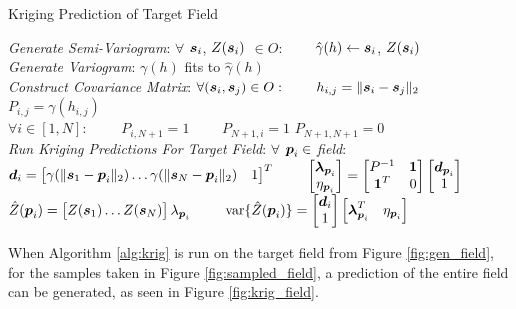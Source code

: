 \begin{algorithm}[thpb!]
\caption{Kriging Prediction of Target Field}\label{alg:krig}
\begin{algorithmic}[1]
\BState \emph{Generate Semi-Variogram}:
\State $\forall$ ${\it{\boldsymbol{s}}}_i$, $Z({\it{\boldsymbol{s}}}_i)$ $\in O$:
\State \ \ \ \ $\hat{\gamma}(h) \gets {\it{\boldsymbol{s}}}_i$, $Z({\it{\boldsymbol{s}}}_i)$\\
\BState \emph{Generate Variogram}:
\State $\gamma(h)$ fits to $\hat{\gamma}(h)$\\
\BState \emph{Construct Covariance Matrix}:
\State $\forall ({\it{\boldsymbol{s}}}_i,{\it{\boldsymbol{s}}}_j) \in O:$
\State \ \ \ \ $h_{i,j} = \|{\it{\boldsymbol{s}}}_i - {\it{\boldsymbol{s}}}_j\|_2$
\State \ \ \ \ $P_{i,j} = \gamma(h_{i,j})$\\
\State $\forall i \in [1, N]:$
\State \ \ \ \ $P_{i,N+1} = 1$
\State \ \ \ \ $P_{N+1,i} = 1$
\State $P_{N+1,N+1} = 0$\\
\BState \emph{Run Kriging Predictions For Target Field}:
\State $\forall$ ${\it{\boldsymbol{p}}}_i \in$ \textit{field}:
\State \ \ \ \ ${\it{\boldsymbol{d}}}_{i} = \begin{bmatrix} \gamma(\| {\it{\boldsymbol{s}}}_1 - {\it{\boldsymbol{p}}}_i \|_2) \dots \gamma(\| {\it{\boldsymbol{s}}}_N - {\it{\boldsymbol{p}}}_i \|_2) & 1\end{bmatrix}^T$
\State \ \ \ \ $\begin{bmatrix}
                {\it{\boldsymbol{\lambda}}}_{{\it{\boldsymbol{p}}}_i} \\
                \eta_{{\it{\boldsymbol{p}}}_i}
                \end{bmatrix} = \begin{bmatrix} P^{-1} & {\it{\boldsymbol{1}}} \\
                                    {\it{\boldsymbol{1}}}^T & 0 \end{bmatrix}
                                    \begin{bmatrix} 
                                    {\it{\boldsymbol{d}}}_{{\it{\boldsymbol{p}}}_i} \\
                                    1
                                    \end{bmatrix}$
\State \ \ \ \ $\hat{Z}({\it{\boldsymbol{p}}}_i) = \begin{bmatrix} Z({\it{\boldsymbol{s}}}_1) \dots Z({\it{\boldsymbol{s}}}_N) \end{bmatrix} \lambda_{{\it{\boldsymbol{p}}}_i}$
\State \ \ \ \ $\text{var}\{\hat{Z}({\it{\boldsymbol{p}}}_i)\} = \begin{bmatrix}{\it{\boldsymbol{d}}}_i \\ 1\end{bmatrix} \begin{bmatrix}{\it{\boldsymbol{\lambda}}}_{{\it{\boldsymbol{p}}}_i}^T & \eta_{{\it{\boldsymbol{p}}}_i} \end{bmatrix}$
\EndProcedure
\end{algorithmic}
\end{algorithm}

When Algorithm \ref{alg:krig} is run on the target field from Figure \ref{fig:gen_field}, for the samples taken in Figure \ref{fig:sampled_field}, a prediction of the entire field can be generated, as seen in Figure \ref{fig:krig_field}.